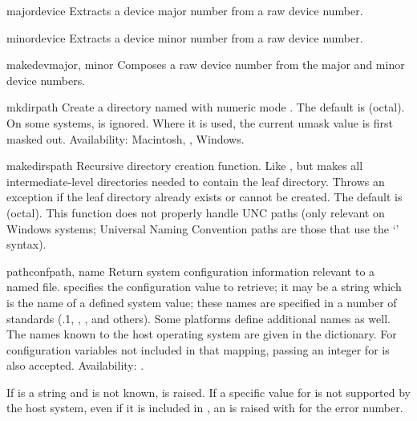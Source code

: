 \begin{funcdesc}{major}{device}
Extracts a device major number from a raw device number.
\end{funcdesc}

\begin{funcdesc}{minor}{device}
Extracts a device minor number from a raw device number.
\end{funcdesc}

\begin{funcdesc}{makedev}{major, minor}
Composes a raw device number from the major and minor device numbers.
\end{funcdesc}

\begin{funcdesc}{mkdir}{path}
Create a directory named  with numeric mode .
The default  is  (octal).  On some systems,
 is ignored.  Where it is used, the current umask value is
first masked out.
Availability: Macintosh, \UNIX, Windows.
\end{funcdesc}

\begin{funcdesc}{makedirs}{path}
Recursive directory creation function.
Like ,
but makes all intermediate-level directories needed to contain the
leaf directory.  Throws an  exception if the leaf
directory already exists or cannot be created.  The default 
is  (octal).  This function does not properly handle UNC
paths (only relevant on Windows systems; Universal Naming Convention
paths are those that use the `' syntax).
\end{funcdesc}

\begin{funcdesc}{pathconf}{path, name}
Return system configuration information relevant to a named file.
 specifies the configuration value to retrieve; it may be a
string which is the name of a defined system value; these names are
specified in a number of standards (\POSIX.1, , , and
others).  Some platforms define additional names as well.  The names
known to the host operating system are given in the
 dictionary.  For configuration variables not
included in that mapping, passing an integer for  is also
accepted.
Availability: \UNIX.

If  is a string and is not known,  is
raised.  If a specific value for  is not supported by the
host system, even if it is included in , an
 is raised with  for the
error number.
\end{funcdesc}

